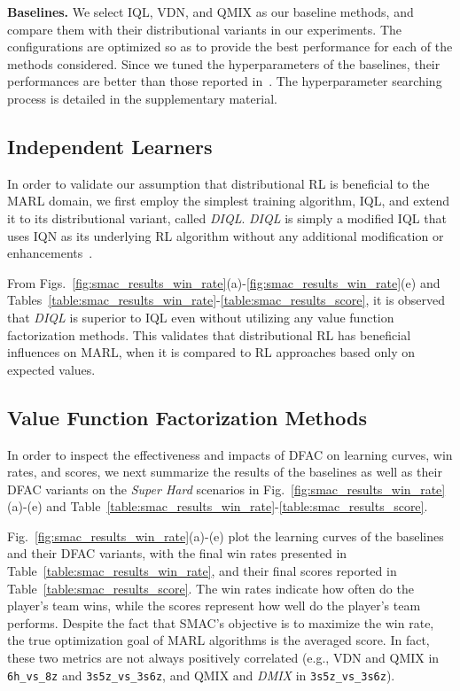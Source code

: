 \documentclass{article}
\newcommand{\diql}{\textit{DIQL}}
\newcommand{\dmix}{\textit{DMIX}}
\begin{document}
\textbf{Baselines.}
We select IQL, VDN, and QMIX as our baseline methods, and compare them with their distributional variants in our experiments. The configurations are optimized so as to provide the best performance for each of the methods considered.
Since we tuned the hyperparameters of the baselines, their performances are better than those reported in~\cite{Samvelyan2019SMAC}. The hyperparameter searching process is detailed in the supplementary material.



\subsection{Independent Learners}
\label{subsec:experiment_results_independent_learners}

In order to validate our assumption that distributional RL is beneficial to the MARL domain, we first employ the simplest training algorithm, IQL, and extend it to its distributional variant, called \diql{}. \diql{} is simply a modified IQL that uses IQN as its underlying RL algorithm without any additional modification or enhancements~\cite{Matignon2007Hysteretic,Lyu2020LikelihoodQuantile}.

From Figs.~\ref{fig:smac_results_win_rate}(a)-\ref{fig:smac_results_win_rate}(e) and Tables~\ref{table:smac_results_win_rate}-\ref{table:smac_results_score}, it is observed that \diql{} is superior to IQL even without utilizing any value function factorization methods. This validates that distributional RL has beneficial influences on MARL, when it is compared to RL approaches based only on expected values.



\subsection{Value Function Factorization Methods}
\label{subsec:experiment_results_super_hard}

In order to inspect the effectiveness and impacts of DFAC on learning curves, win rates, and scores, we next summarize the results of the baselines as well as their DFAC variants on the \textit{Super Hard} scenarios in Fig.~\ref{fig:smac_results_win_rate}(a)-(e) and Table~\ref{table:smac_results_win_rate}-\ref{table:smac_results_score}.

Fig.~\ref{fig:smac_results_win_rate}(a)-(e) plot the learning curves of the baselines and their DFAC variants, with the final win rates presented in Table~\ref{table:smac_results_win_rate}, and their final scores reported in Table~\ref{table:smac_results_score}. The win rates indicate how often do the player's team wins, while the scores represent how well do the player's team performs. Despite the fact that SMAC's objective is to maximize the win rate, the true optimization goal of MARL algorithms is the averaged score. In fact, these two metrics are not always positively correlated (e.g., VDN and QMIX in \texttt{6h\_vs\_8z} and \texttt{3s5z\_vs\_3s6z}, and QMIX and \dmix{} in \texttt{3s5z\_vs\_3s6z}).
\end{document}
